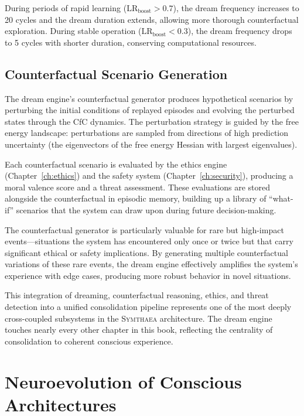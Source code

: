 \documentclass[12pt]{book}
\newcommand{\symthaea}{\textsc{Symthaea}}
\begin{document}
During periods of rapid learning ($\text{LR}_{\text{boost}} > 0.7$), the dream frequency increases to 20 cycles and the dream duration extends, allowing more thorough counterfactual exploration. During stable operation ($\text{LR}_{\text{boost}} < 0.3$), the dream frequency drops to 5 cycles with shorter duration, conserving computational resources.

\section{Counterfactual Scenario Generation}

The dream engine's counterfactual generator produces hypothetical scenarios by perturbing the initial conditions of replayed episodes and evolving the perturbed states through the CfC dynamics. The perturbation strategy is guided by the free energy landscape: perturbations are sampled from directions of high prediction uncertainty (the eigenvectors of the free energy Hessian with largest eigenvalues).

Each counterfactual scenario is evaluated by the ethics engine (Chapter~\ref{ch:ethics}) and the safety system (Chapter~\ref{ch:security}), producing a moral valence score and a threat assessment. These evaluations are stored alongside the counterfactual in episodic memory, building up a library of ``what-if'' scenarios that the system can draw upon during future decision-making.

The counterfactual generator is particularly valuable for rare but high-impact events---situations the system has encountered only once or twice but that carry significant ethical or safety implications. By generating multiple counterfactual variations of these rare events, the dream engine effectively amplifies the system's experience with edge cases, producing more robust behavior in novel situations.

This integration of dreaming, counterfactual reasoning, ethics, and threat detection into a unified consolidation pipeline represents one of the most deeply cross-coupled subsystems in the \symthaea{} architecture. The dream engine touches nearly every other chapter in this book, reflecting the centrality of consolidation to coherent conscious experience.


\chapter{Neuroevolution of Conscious Architectures}
\label{ch:neuroevo}
\end{document}
